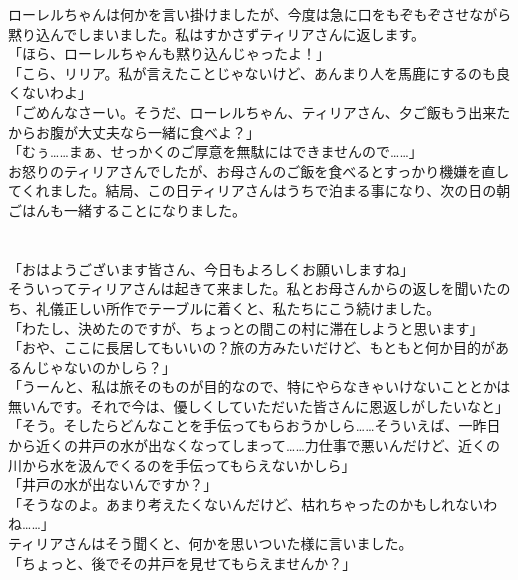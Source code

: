 \documentclass[oneside, a4paper]{jsbook}
\begin{document}
ローレルちゃんは何かを言い掛けましたが、今度は急に口をもぞもぞさせながら黙り込んでしまいました。私はすかさずティリアさんに返します。\\

\noindent
「ほら、ローレルちゃんも黙り込んじゃったよ！」\\
「こら、リリア。私が言えたことじゃないけど、あんまり人を馬鹿にするのも良くないわよ」\\
「ごめんなさーい。そうだ、ローレルちゃん、ティリアさん、夕ご飯もう出来たからお腹が大丈夫なら一緒に食べよ？」\\
「むぅ……まぁ、せっかくのご厚意を無駄にはできませんので……」\\

お怒りのティリアさんでしたが、お母さんのご飯を食べるとすっかり機嫌を直してくれました。結局、この日ティリアさんはうちで泊まる事になり、次の日の朝ごはんも一緒することになりました。\\\\\\

\noindent
「おはようございます皆さん、今日もよろしくお願いしますね」\\

そういってティリアさんは起きて来ました。私とお母さんからの返しを聞いたのち、礼儀正しい所作でテーブルに着くと、私たちにこう続けました。\\

\noindent
「わたし、決めたのですが、ちょっとの間この村に滞在しようと思います」\\
「おや、ここに長居してもいいの？旅の方みたいだけど、もともと何か目的があるんじゃないのかしら？」\\
「うーんと、私は旅そのものが目的なので、特にやらなきゃいけないこととかは無いんです。それで今は、優しくしていただいた皆さんに恩返しがしたいなと」\\
「そう。そしたらどんなことを手伝ってもらおうかしら……そういえば、一昨日から近くの井戸の水が出なくなってしまって……力仕事で悪いんだけど、近くの川から水を汲んでくるのを手伝ってもらえないかしら」\\
「井戸の水が出ないんですか？」\\
「そうなのよ。あまり考えたくないんだけど、枯れちゃったのかもしれないわね……」\\

ティリアさんはそう聞くと、何かを思いついた様に言いました。\\

\noindent
「ちょっと、後でその井戸を見せてもらえませんか？」\\\\\\
\end{document}
